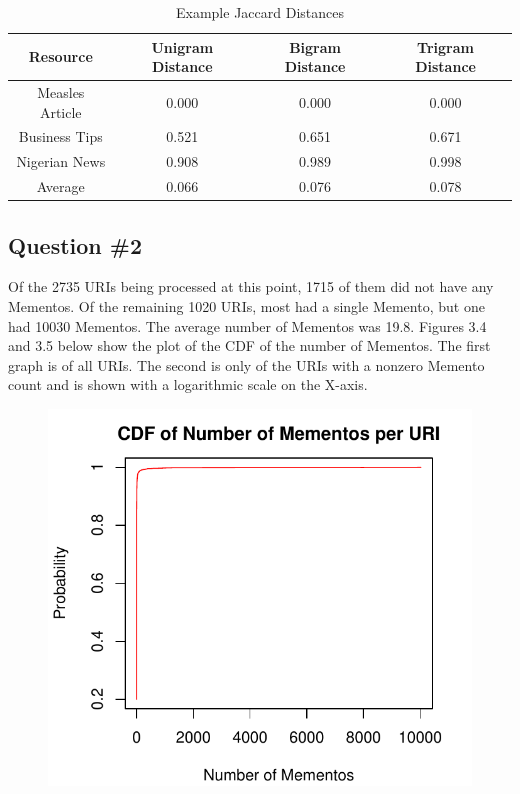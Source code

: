 \documentclass[a4paper,12pt]{article}
\begin{document}
\begin{table}[H]
\centering
\caption{Example Jaccard Distances}
\begin{tabular}{ | c | c | c | c | }
\hline
\textbf{Resource}  & \textbf{Unigram Distance} & \textbf{Bigram Distance} & \textbf{Trigram Distance} \\ \hline
Measles Article & 0.000  & 0.000  & 0.000  \\ \hline
Business Tips   & 0.521  & 0.651  & 0.671  \\ \hline
Nigerian News   & 0.908  & 0.989  & 0.998  \\ \hline
Average         & 0.066  & 0.076  & 0.078  \\ \hline
\end{tabular}
\end{table}


\subsection{Question \#2}
Of the 2735 URIs being processed at this point, 1715 of them did not have any Mementos. Of the remaining
1020 URIs, most had a single Memento, but one had 10030 Mementos. The average number of Mementos was 19.8.
Figures 3.4 and 3.5 below show the plot of the CDF of the number of Mementos. The first graph is of all
URIs. The second is only of the URIs with a nonzero Memento count and is shown with a logarithmic scale
on the X-axis.

\begin{figure}[H]
    \centering
    \includegraphics{stats/memento_counts.pdf}
\end{figure}
\end{document}
